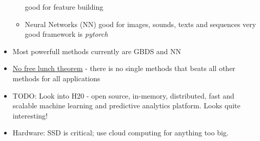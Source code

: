 \documentclass[a4paper]{report}
\begin{document}
\begin{itemize}
\begin{itemize}
	\subitem good for feature building
      \item Neural Networks (NN)
	\subitem good for images, sounds, texts and sequences
	\subitem very good framework is \emph{pytorch}
    \end{itemize}
  \item Most powerfull methods currently are GBDS and NN
  \item \underline{No free lunch theorem} - there is no single methods that beats all other methods for all applications
  \item TODO: Look into H20 - open source, in-memory, distributed, fast and scalable machine learning and predictive analytics platform.
    \subitem Looks quite interesting!
  \item Hardware: SSD is critical; use cloud computing for anything too big.
\end{itemize}	
\end{document}
